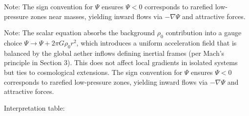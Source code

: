 \documentclass{article}
\begin{document}



Note: The sign convention for $\Psi$ ensures $\Psi < 0$ corresponds to rarefied low-pressure zones near masses, yielding inward flows via $-\nabla \Psi$ and attractive forces.

Note: The scalar equation absorbs the background $\rho_0$ contribution into a gauge choice $\Psi \to \Psi + 2\pi G \rho_0 r^2$, which introduces a uniform acceleration field that is balanced by the global aether inflows defining inertial frames (per Mach's principle in Section 3). This does not affect local gradients in isolated systems but ties to cosmological extensions. The sign convention for $\Psi$ ensures $\Psi < 0$ corresponds to rarefied low-pressure zones, yielding inward flows via $-\nabla \Psi$ and attractive forces.

Interpretation table:
\end{document}
